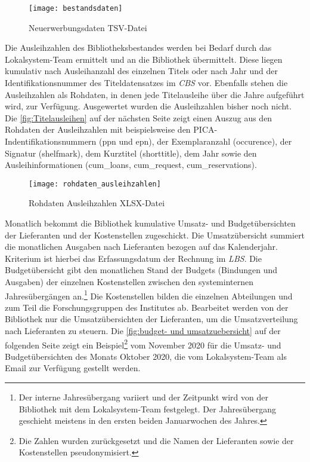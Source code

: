 \begin{figure}[H]
    \centering
        \texttt{[image: bestandsdaten]}
        \caption{Neuerwerbungsdaten TSV-Datei}
        \label{fig:Bestandsdaten}
\end{figure}


Die Ausleihzahlen des Bibliotheksbestandes werden bei Bedarf durch das Lokalsystem-Team ermittelt und an die Bibliothek übermittelt. 
Diese liegen kumulativ nach Ausleihanzahl des einzelnen Titels oder nach Jahr und der Identifikationsnummer des Titeldatensatzes im 
\textit{\acrshort{CBS}} vor. Ebenfalls stehen die Ausleihzahlen als Rohdaten, in denen jede Titelausleihe über die Jahre aufgeführt wird, zur Verfügung.
Ausgewertet wurden die Ausleihzahlen bisher noch nicht. Die \autoref{fig:Titelausleihen} auf der nächsten Seite zeigt einen Auszug aus den Rohdaten der Ausleihzahlen mit 
beispielsweise den PICA-Indentifikationsnummern (ppn und epn), der Exemplaranzahl (occurence), der Signatur (shelfmark), dem Kurztitel (shorttitle),
dem Jahr sowie den Ausleihinformationen (cum\_loans, cum\_request, cum\_reservations).


\begin{figure}[H]
    \centering
        \texttt{[image: rohdaten\_ausleihzahlen]}
        \caption{Rohdaten Ausleihzahlen XLSX-Datei}
        \label{fig:Titelausleihen}
\end{figure}


Monatlich bekommt die Bibliothek kumulative Umsatz- und Budgetübersichten der Lieferanten und der Kostenstellen zugeschickt.
Die Umsatzübersicht summiert die monatlichen Ausgaben nach Lieferanten bezogen auf das Kalenderjahr. Kriterium ist hierbei das Erfassungsdatum der Rechnung im \textit{\acrshort{LBS}}. 
Die Budgetübersicht gibt den monatlichen Stand der Budgets (Bindungen und Ausgaben) der einzelnen Kostenstellen zwischen den systeminternen Jahresübergängen an.\footnote{ Der
interne Jahresübergang variiert und der Zeitpunkt wird von der Bibliothek mit dem Lokalsystem-Team festgelegt. Der Jahresübergang geschieht meistens in den ersten beiden Januarwochen des Jahres.}
Die Kostenstellen bilden die einzelnen Abteilungen und zum Teil die Forschungsgruppen des Institutes ab.
Bearbeitet werden von der Bibliothek nur die Umsatzübersichten der Lieferanten, um die Umsatzverteilung nach Lieferanten zu steuern.
Die \autoref{fig:budget- und umsatzuebersicht} auf der folgenden Seite zeigt ein Beispiel\footnote{ Die Zahlen wurden zurückgesetzt und die Namen der Lieferanten sowie der Kostenstellen pseudonymisiert.} vom November 2020 für die Umsatz- und Budgetübersichten des Monats Oktober 2020, die vom Lokalsystem-Team als Email zur Verfügung gestellt werden.


